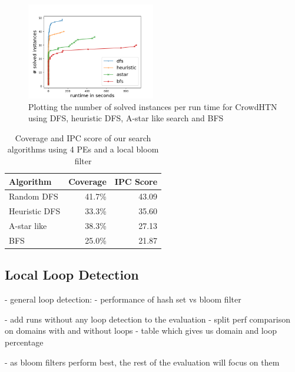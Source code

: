 \begin{figure}
	\caption{Plotting the number of solved instances per run time for CrowdHTN using DFS, heuristic DFS, A-star like search and BFS}
	\label{figure: eval algorithm}
	\centering
	\includegraphics[width=0.5\textwidth]{images/final/search_algorithms.png}
\end{figure}
\begin{table}
	\caption{Coverage and IPC score of our search algorithms using 4 PEs and a local bloom filter}
	\label{table: eval algorithm}
	\centering
	\begin{tabular}{| l | r | r |}
		\hline
		Algorithm 		& Coverage & IPC Score \\
		\hline
		Random DFS 		& 41.7\%	& 43.09 \\ %
		Heuristic DFS 	& 33.3\%	& 35.60	\\ %
		A-star like 	& 38.3\%	& 27.13 \\ %
		BFS 			& 25.0\%	& 21.87	\\ %
		\hline
	\end{tabular}
\end{table}

\subsection{Local Loop Detection}
\label{eval: loop detection}
- general loop detection:
- performance of hash set vs bloom filter

- add runs without any loop detection to the evaluation
- split perf comparison on domains with and without loops
- table which gives us domain and loop percentage

- as bloom filters perform best, the rest of the evaluation will focus on them

